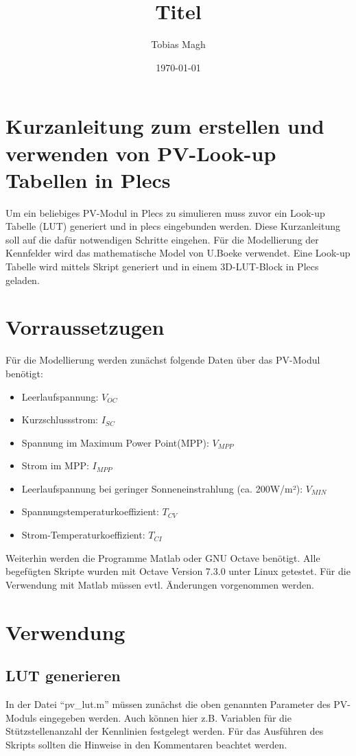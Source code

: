 \documentclass[a4paper,11pt,oneside]{article}
\title{Titel}
\author{Tobias Magh}
\date{\today}
\begin{document}
	\pagestyle{fancy}
	\section*{Kurzanleitung zum erstellen und verwenden von PV-Look-up Tabellen in Plecs}
	Um ein beliebiges PV-Modul in Plecs zu simulieren muss zuvor ein Look-up Tabelle (LUT) generiert und in plecs eingebunden werden. Diese Kurzanleitung soll auf die dafür notwendigen Schritte eingehen.
	Für die Modellierung der Kennfelder wird das mathematische Model von U.Boeke \cite{Boeke} verwendet. Eine Look-up Tabelle wird mittels Skript generiert und in einem 3D-LUT-Block in Plecs geladen.
	\setcounter{section}{0}
	\section{Vorraussetzugen}
		Für die Modellierung werden zunächst folgende Daten über das PV-Modul benötigt:
		\begin{singlespace}
			\begin{itemize}
				\item Leerlaufspannung: $V_{OC}$
				\item Kurzschlussstrom: $I_{SC}$
				\item Spannung im Maximum Power Point(MPP): $V_{MPP}$
				\item Strom im MPP: $I_{MPP}$
				\item Leerlaufspannung bei geringer Sonneneinstrahlung (ca. 200W/m²): $V_{MIN}$
				\item Spannungstemperaturkoeffizient: $T_{CV}$
				\item Strom-Temperaturkoeffizient: $T_{CI}$
			\end{itemize} 
		\end{singlespace}
	
		\noindent
		Weiterhin werden die Programme Matlab\cite{MATLAB} oder GNU Octave benötigt. Alle begefügten Skripte wurden mit Octave Version 7.3.0 unter Linux getestet. Für die Verwendung mit Matlab müssen evtl. Änderungen vorgenommen werden.
	\section{Verwendung}
		\subsection{LUT generieren}
			In der Datei \enquote{pv\_lut.m} müssen zunächst die oben genannten Parameter des PV-Moduls eingegeben werden. Auch können hier z.B. Variablen für die Stützstellenanzahl der Kennlinien festgelegt werden. Für das Ausführen des Skripts sollten die Hinweise in den Kommentaren beachtet werden.\\ 
\end{document}
